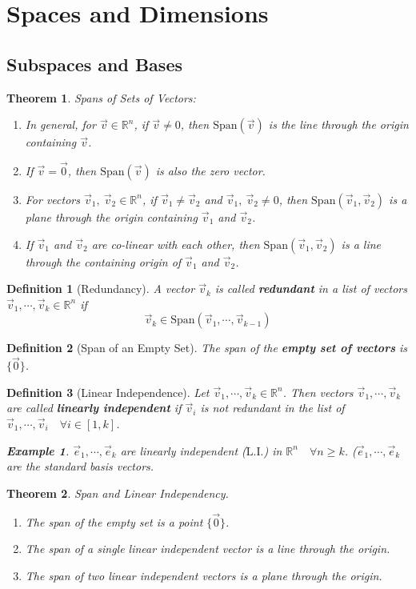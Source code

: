 \documentclass[12pt, a4paper]{article}
\newtheorem{thm}{Theorem}[subsection]
\newtheorem{df}{Definition}[subsection]
\newtheorem{eg}{Example}[subsection]
\def\R{{\mathbb{R}}}
\def\Span{\mathrm{Span}}
\def\vecv{\vec{v}}
\def\vece{\vec{e}}
\def\LI{\mathrm{L.I.}}
\begin{document}
\newpage
\section{Spaces and Dimensions}
\subsection{Subspaces and Bases}
\begin{thm}
Spans of Sets of Vectors: 
	\begin{enumerate}
		\item In general, for $\vecv\in\R^n$, if $\vecv\neq0$, then $\Span(\vecv)$ is the line through the origin containing $\vecv$.
		\item If $\vecv=\vec{0}$, then $\Span(\vecv)$ is also the zero vector.
		\item For vectors $\vecv_1,\ \vecv_2\in\R^n$, if $\vecv_1\neq\vecv_2$ and $\vecv_1,\ \vecv_2\neq0$, then $\Span(\vecv_1,\vecv_2)$ is a plane through the origin containing $\vecv_1$ and $\vecv_2$. 
		\item If $\vecv_1$ and $\vecv_2$ are co-linear with each other, then $\Span(\vecv_1,\vecv_2)$ is a line through the containing origin of $\vecv_1$ and $\vecv_2$.
	\end{enumerate}
\end{thm}
\begin{df}[Redundancy]
	A vector $\vecv_k$ is called \textbf{redundant} in a list of vectors $\vecv_1,\cdots,\vecv_k\in\R^n$ if \[\vecv_k\in\Span(\vecv_1,\cdots,\vecv_{k-1})\]	
\end{df}
\begin{df}[Span of an Empty Set]
	The span of the \textbf{empty set of vectors} is $\{\vec{0}\}$. 	
\end{df}
\begin{df}[Linear Independence]
	Let $\vecv_1,\cdots,\vecv_k\in\R^n$. Then vectors $\vecv_1,\cdots,\vecv_k$ are called \textbf{linearly independent} if $\vecv_i$ is not redundant in the list of $\vecv_1,\cdots,\vecv_i\quad\forall i\in[1,k]$. 
	\begin{eg}
		$\vece_1,\cdots,\vece_k$ are linearly independent ($\LI$) in $\R^n\quad\forall n\geq k$. ($\vece_1,\cdots,\vece_k$ are the standard basis vectors.	
	\end{eg}
\end{df}
\begin{thm}
	Span and Linear Independency.
	\begin{enumerate}
		\item The span of the empty set is a point $\{\vec{0}\}$.
		\item The span of a single linear independent vector is a line through the origin.
		\item The span of two linear independent vectors is a plane through the origin. 
	\end{enumerate}	
\end{thm}
\end{document}
